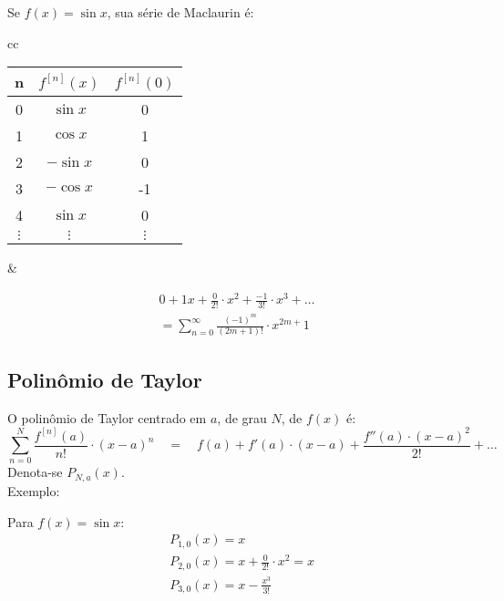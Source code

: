 \documentclass{article}
\begin{document}
Se $f(x) = \sin x$, sua s\'erie de Maclaurin \'e:
\begin{table}[h]
  \qquad
  \begin{tabular}{cc}
    \begin{minipage}{0.25\textwidth}
      \begin{flushleft}
        \begin{tabular}{|c|c|c|}
          \hline
          \rule{0pt}{2.5ex}n & $f^{[n]}(x)$ & $f^{[n]}(0)$ \\
          \hline
          0 & $\sin x$  & 0  \\
          1 & $\cos x$  & 1  \\
          2 & $-\sin x$ & 0  \\
          3 & $-\cos x$ & -1 \\
          4 & $\sin x$ & 0 \\
          $\vdots$ & $\vdots$ & $\vdots$ \\
          \hline
        \end{tabular}
      \end{flushleft}
    \end{minipage}
    &
    \begin{minipage}{0.45\textwidth}
      \begin{gather*}
        0 + 1x + \frac{0}{2!} \cdot x^2 + \frac{-1}{3!} \cdot x^3 + \hdots \\[5pt]
        = \sum_{n=0}^{\infty} \frac{{(-1)}^m}{(2m + 1)!} \cdot x^{2m + }1
      \end{gather*}
    \end{minipage}
  \end{tabular}
\end{table}


\subsection{Polin\^omio de Taylor}

O polin\^omio de Taylor centrado em $a$, de grau $N$, de $f(x)$ \'e:
\[\sum_{n=0}^N \frac{f^{[n]}(a)}{n!} \cdot {(x - a)}^n \quad = \quad f(a) + f'(a)\cdot(x - a) + \frac{f''(a) \cdot {(x - a)}^2}{2!} + \hdots\]
Denota-se $P_{N,a}(x)$. \\[10pt]
Exemplo:

Para $f(x) = \sin x$:
\begin{align*}
  & P_{1,0}(x) = x \\
  & P_{2,0}(x) = x + \frac{0}{2!} \cdot x^2 = x \\
  & P_{3,0}(x) = x - \frac{x^3}{3!}
\end{align*}
\end{document}
